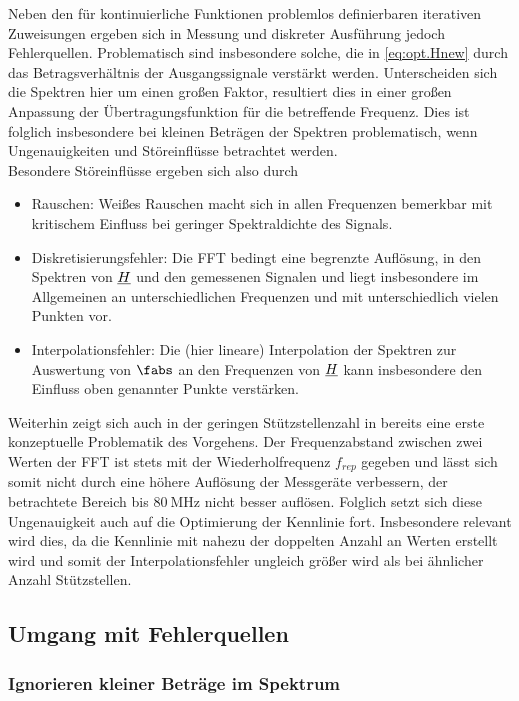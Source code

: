 \documentclass[../Report.tex]{subfiles}
\begin{document}
 
Neben den für kontinuierliche Funktionen problemlos definierbaren iterativen Zuweisungen ergeben sich in Messung und diskreter Ausführung jedoch Fehlerquellen. Problematisch sind insbesondere solche, die in \eqref{eq:opt.Hnew} durch das Betragsverhältnis der Ausgangssignale verstärkt werden. 
Unterscheiden sich die Spektren hier um einen großen Faktor, resultiert dies in einer großen Anpassung der Übertragungsfunktion für die betreffende Frequenz. Dies ist folglich insbesondere bei kleinen Beträgen der Spektren problematisch, wenn Ungenauigkeiten und Störeinflüsse betrachtet werden. 
\\
Besondere Störeinflüsse ergeben sich also durch
\begin{itemize}
	\item Rauschen: Weißes Rauschen macht sich in allen Frequenzen bemerkbar mit kritischem Einfluss bei geringer Spektraldichte des Signals.
	
	\item Diskretisierungsfehler: Die FFT bedingt eine begrenzte Auflösung, in den Spektren von $\underline{H}$ und den gemessenen Signalen und liegt insbesondere im Allgemeinen an unterschiedlichen Frequenzen und mit unterschiedlich vielen Punkten vor.
	
	\item Interpolationsfehler: Die (hier lineare) Interpolation der Spektren zur Auswertung von $\fabs$ an den Frequenzen von $\underline{H}$ kann insbesondere den Einfluss oben genannter Punkte verstärken.
\end{itemize}

Weiterhin zeigt sich auch in der geringen Stützstellenzahl in  bereits eine erste konzeptuelle Problematik des Vorgehens. Der Frequenzabstand zwischen zwei Werten der FFT ist stets mit der Wiederholfrequenz $f_{rep}$ gegeben und lässt sich somit nicht durch eine höhere Auflösung der Messgeräte verbessern, der betrachtete Bereich bis $\SI{80}{\MHz}$ nicht besser auflösen.
Folglich setzt sich diese Ungenauigkeit auch auf die Optimierung der Kennlinie fort. Insbesondere relevant wird dies, da die Kennlinie mit nahezu der doppelten Anzahl an Werten erstellt wird und somit der Interpolationsfehler ungleich größer wird als bei ähnlicher Anzahl Stützstellen.


\subsection{Umgang mit Fehlerquellen}
\subsubsection*{Ignorieren kleiner Beträge im Spektrum}
\label{subsubsec:opt.H.prom}
\end{document}
